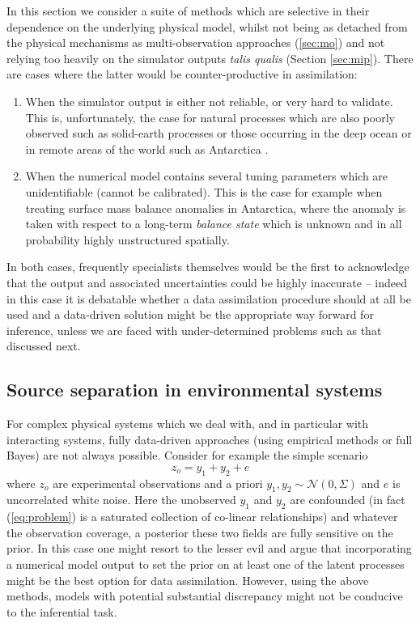 \documentclass[10pt,a4paper]{article}
\begin{document}
In this section we consider a suite of methods which are selective in their dependence on the underlying physical model, whilst not being as detached from the physical mechanisms as multi-observation approaches (\ref{sec:mo}) and not relying too heavily on the simulator outputs \emph{talis qualis} (Section \ref{sec:mip}). There are cases where the latter would be counter-productive in assimilation: 
\begin{enumerate}
\item When the simulator output is either not reliable, or very hard to validate. This is, unfortunately, the case for natural processes which are also poorly observed such as solid-earth processes or those occurring in the deep ocean or in remote areas of the world such as Antarctica \citep{Guo_2012}. 
\item When the numerical model contains several tuning parameters which are unidentifiable (cannot be calibrated). This is the case for example when treating surface mass balance anomalies in Antarctica, where the anomaly is taken with respect to a long-term \emph{balance state} which is unknown and in all probability highly unstructured spatially. 
\end{enumerate}
In both cases, frequently specialists themselves would be the first to acknowledge that the output and associated uncertainties could be highly inaccurate -- indeed in this case it is debatable whether a data assimilation procedure should at all be used and a data-driven solution might be the appropriate way forward for inference, unless we are faced with under-determined problems such as that discussed next. 

\subsection{Source separation in environmental systems}

For complex physical systems which we deal with, and in particular with interacting systems, fully data-driven approaches (using empirical methods or full Bayes) are not always possible. Consider for example the simple scenario
\begin{equation}\label{eq:problem}
z_o = y_1 + y_2 + e
\end{equation}
\noindent where $z_o$ are experimental observations and a priori $y_1,y_2 \sim \mathcal{N}(0,{\Sigma})$ and $e$ is uncorrelated white noise. Here the unobserved $y_1$ and $y_2$ are confounded (in fact (\ref{eq:problem}) is a saturated collection of co-linear relationships) and whatever the observation coverage, a posterior these two fields are fully sensitive on the prior. In this case one might resort to the lesser evil and argue that incorporating a numerical model output to set the prior on at least one of the latent processes might be the best option for data assimilation. However, using the above methods, models with potential substantial discrepancy might not be conducive to the inferential task. 
\end{document}
